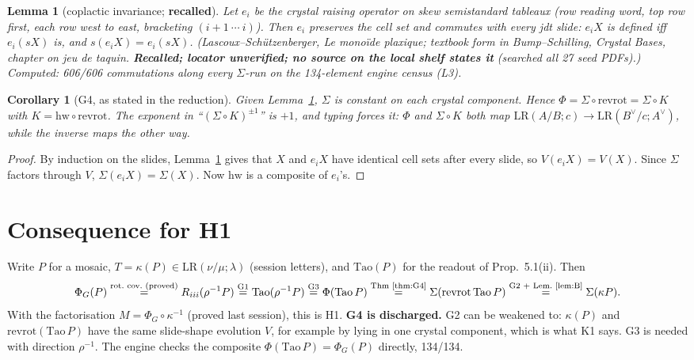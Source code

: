 \documentclass[11pt]{article}
\newtheorem{lemma}[theorem]{Lemma}
\newtheorem{corollary}[theorem]{Corollary}
\theoremstyle{definition}
\newcommand{\LR}{\mathrm{LR}}
\newcommand{\rr}{\mathrm{revrot}}
\newcommand{\hw}{\mathrm{hw}}
\begin{document}
\begin{lemma}[coplactic invariance; \textbf{recalled}]\label{lem:B}
Let $e_i$ be the crystal raising operator on skew semistandard tableaux (row reading word, top row first, each row west to
east, bracketing $(i{+}1\ \cdots\ i)$). Then $e_i$ preserves the cell set and commutes with every jdt slide: $e_iX$ is
defined iff $e_i(sX)$ is, and $s(e_iX)=e_i(sX)$. (Lascoux--Schützenberger, \emph{Le monoïde plaxique}; textbook form in
Bump--Schilling, \emph{Crystal Bases}, chapter on jeu de taquin. \textbf{Recalled; locator unverified; no source on the local
shelf states it} (searched all 27 seed PDFs).) \emph{Computed:} 606/606 commutations along every $\Sigma$-run on the
134-element engine census (L3).
\end{lemma}
\begin{corollary}[G4, as stated in the reduction]\label{cor:G4}
Given Lemma~\ref{lem:B}, $\Sigma$ is constant on each crystal component. Hence $\Phi=\Sigma\circ\rr=\Sigma\circ K$ with
$K=\hw\circ\rr$. The exponent in ``$(\Sigma\circ K)^{\pm1}$'' is $+1$, and typing forces it: $\Phi$ and $\Sigma\circ K$
both map $\LR(A/B;c)\to\LR(B^\vee/c;A^\vee)$, while the inverse maps the other way.
\end{corollary}
\begin{proof}
By induction on the slides, Lemma~\ref{lem:B} gives that $X$ and $e_iX$ have identical cell sets after every slide, so
$V(e_iX)=V(X)$. Since $\Sigma$ factors through $V$, $\Sigma(e_iX)=\Sigma(X)$. Now $\hw$ is a composite of $e_i$'s.
\end{proof}

\section{Consequence for H1}
Write $P$ for a mosaic, $T=\kappa(P)\in\LR(\nu/\mu;\lambda)$ (session letters), and $\mathrm{Tao}(P)$ for the readout of
Prop.~5.1(ii). Then
\[
\Phi_G(P)\overset{\text{rot.\ cov.\ (proved)}}{=}R_{iii}(\rho^{-1}P)\overset{\text{G1}}{=}\mathrm{Tao}(\rho^{-1}P)
\overset{\text{G3}}{=}\Phi(\mathrm{Tao}\,P)\overset{\text{Thm~\ref{thm:G4}}}{=}\Sigma(\rr\,\mathrm{Tao}\,P)
\overset{\text{G2 + Lem.~\ref{lem:B}}}{=}\Sigma(\kappa P).
\]
With the factorisation $M=\Phi_G\circ\kappa^{-1}$ (proved last session), this is H1. \textbf{G4 is discharged.} G2 can
be weakened to: $\kappa(P)$ and $\rr(\mathrm{Tao}\,P)$ have the same slide-shape evolution $V$, for example by lying in one
crystal component, which is what K1 says. G3 is needed with direction $\rho^{-1}$. The engine checks the composite
$\Phi(\mathrm{Tao}\,P)=\Phi_G(P)$ directly, 134/134.
\end{document}
